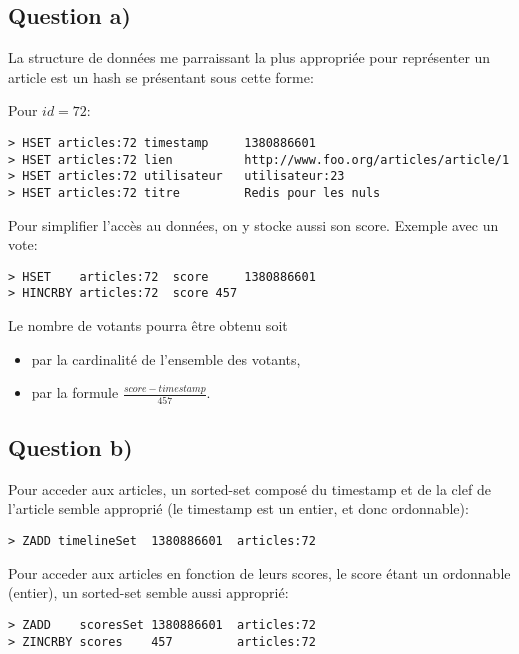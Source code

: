 \documentclass[article,a4paper,12pt]{article}
\begin{document}
\subsection{Question a)}
\label{sec:orgheadline3}

La structure de données me parraissant la plus appropriée pour représenter un
article est un hash se présentant sous cette forme:

Pour \(id = 72\):

\begin{verbatim}
> HSET articles:72 timestamp     1380886601
> HSET articles:72 lien          http://www.foo.org/articles/article/1
> HSET articles:72 utilisateur   utilisateur:23
> HSET articles:72 titre         Redis pour les nuls
\end{verbatim}

Pour simplifier l'accès au données, on y stocke aussi son score. Exemple avec un vote:

\begin{verbatim}
> HSET    articles:72  score     1380886601
> HINCRBY articles:72  score 457
\end{verbatim}

Le nombre de votants pourra être obtenu soit
\begin{itemize}
\item par la cardinalité de l'ensemble des votants,
\item par la formule \(\frac{score-timestamp}{457}\).
\end{itemize}

\subsection{Question b)}
\label{sec:orgheadline4}

Pour acceder aux articles, un sorted-set composé du timestamp et de la clef de
l'article semble approprié (le timestamp est un entier, et donc ordonnable):

\begin{verbatim}
> ZADD timelineSet  1380886601  articles:72
\end{verbatim}

Pour acceder aux articles en fonction de leurs scores, le score étant un
ordonnable (entier), un sorted-set semble aussi approprié:

\begin{verbatim}
> ZADD    scoresSet 1380886601  articles:72
> ZINCRBY scores    457         articles:72
\end{verbatim}
\end{document}

